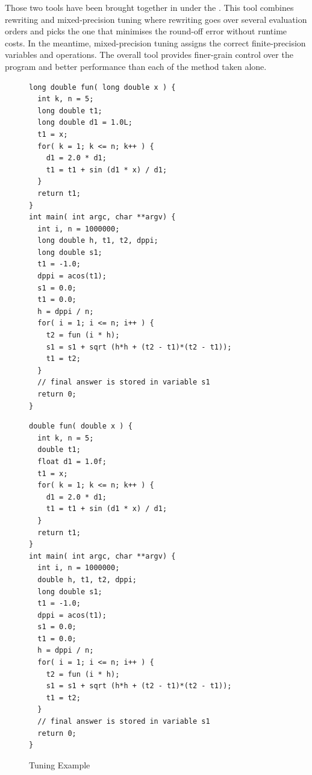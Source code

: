 Those two tools have been brought together in \cite{Darulova2018} under the . This tool combines rewriting and mixed-precision tuning where rewriting goes over several evaluation orders and picks the one that minimises the round-off error without runtime costs. In the meantime, mixed-precision tuning assigns the correct finite-precision variables and operations. The overall tool provides finer-grain control over the program and better performance than each of the method taken alone.
\begin{figure}[htbp]
\centering
\begin{minipage}{.48\textwidth}
\begin{lstlisting}[style=CInputStyle]
long double fun( long double x ) {
  int k, n = 5;
  long double t1;
  long double d1 = 1.0L;
  t1 = x;
  for( k = 1; k <= n; k++ ) {
    d1 = 2.0 * d1;
    t1 = t1 + sin (d1 * x) / d1;
  }
  return t1;
}
int main( int argc, char **argv) {
  int i, n = 1000000;
  long double h, t1, t2, dppi;
  long double s1;
  t1 = -1.0;
  dppi = acos(t1);
  s1 = 0.0;
  t1 = 0.0;
  h = dppi / n;
  for( i = 1; i <= n; i++ ) {
    t2 = fun (i * h);
    s1 = s1 + sqrt (h*h + (t2 - t1)*(t2 - t1));
    t1 = t2;
  }
  // final answer is stored in variable s1
  return 0;
}
\end{lstlisting}
\end{minipage}
\hfill
\begin{minipage}{.48\textwidth}
\begin{lstlisting}[style=CInputStyle]
double fun( double x ) {
  int k, n = 5;
  double t1;
  float d1 = 1.0f;
  t1 = x;
  for( k = 1; k <= n; k++ ) {
    d1 = 2.0 * d1;
    t1 = t1 + sin (d1 * x) / d1;
  }
  return t1;
}
int main( int argc, char **argv) {
  int i, n = 1000000;
  double h, t1, t2, dppi;
  long double s1;
  t1 = -1.0;
  dppi = acos(t1);
  s1 = 0.0;
  t1 = 0.0;
  h = dppi / n;
  for( i = 1; i <= n; i++ ) {
    t2 = fun (i * h);
    s1 = s1 + sqrt (h*h + (t2 - t1)*(t2 - t1));
    t1 = t2;
  }
  // final answer is stored in variable s1
  return 0;
}
\end{lstlisting}
\end{minipage}
\caption[Tuning]{Tuning Example \cite{Rubio2013}}
	\label{fig:Tuning}
\end{figure}


